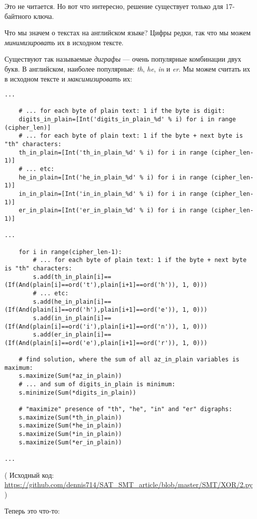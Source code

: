 Это не читается. Но вот что интересно, решение существует только для 17-байтного ключа.

Что мы значем о текстах на английском языке?
Цифры редки, так что мы можем \textit{минимизировать} их в исходном тексте.

Существуют так называемые \textit{диграфы} --- очень популярные комбинации двух букв.
В английском, наиболее популярные: \textit{th}, \textit{he}, \textit{in} и \textit{er}.
Мы можем считать их в исходном тексте и \textit{максимизировать} их:

\begin{lstlisting}
...

    # ... for each byte of plain text: 1 if the byte is digit:
    digits_in_plain=[Int('digits_in_plain_%d' % i) for i in range (cipher_len)]
    # ... for each byte of plain text: 1 if the byte + next byte is "th" characters:
    th_in_plain=[Int('th_in_plain_%d' % i) for i in range (cipher_len-1)]
    # ... etc:
    he_in_plain=[Int('he_in_plain_%d' % i) for i in range (cipher_len-1)]
    in_in_plain=[Int('in_in_plain_%d' % i) for i in range (cipher_len-1)]
    er_in_plain=[Int('er_in_plain_%d' % i) for i in range (cipher_len-1)]

...

    for i in range(cipher_len-1):
        # ... for each byte of plain text: 1 if the byte + next byte is "th" characters:
        s.add(th_in_plain[i]==(If(And(plain[i]==ord('t'),plain[i+1]==ord('h')), 1, 0)))
        # ... etc:
        s.add(he_in_plain[i]==(If(And(plain[i]==ord('h'),plain[i+1]==ord('e')), 1, 0)))
        s.add(in_in_plain[i]==(If(And(plain[i]==ord('i'),plain[i+1]==ord('n')), 1, 0)))
        s.add(er_in_plain[i]==(If(And(plain[i]==ord('e'),plain[i+1]==ord('r')), 1, 0)))

    # find solution, where the sum of all az_in_plain variables is maximum:
    s.maximize(Sum(*az_in_plain))
    # ... and sum of digits_in_plain is minimum:
    s.minimize(Sum(*digits_in_plain))

    # "maximize" presence of "th", "he", "in" and "er" digraphs:
    s.maximize(Sum(*th_in_plain))
    s.maximize(Sum(*he_in_plain))
    s.maximize(Sum(*in_in_plain))
    s.maximize(Sum(*er_in_plain))

...
\end{lstlisting}

( Исходный код: \url{https://github.com/dennis714/SAT_SMT_article/blob/master/SMT/XOR/2.py} )

Теперь это что-то:

